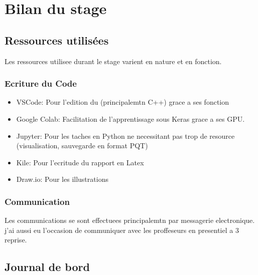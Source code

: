 
\chapter{Bilan du stage} %

\label{Chapter5} %


\section{Ressources utilisées}

Les ressources utilisee durant le stage varient en nature et en fonction.

\subsection{Ecriture du Code}
\begin{itemize}
 \item VSCode: Pour l'edition du (principalemtn C++) grace a ses fonction 
 \item Google Colab: Facilitation de l'apprentissage sous Keras grace a ses GPU.
 \item Jupyter: Pour les taches en Python ne necessitant pas trop de resource (visualisation, sauvegarde en format PQT)
 \item Kile: Pour l'ecritude du rapport en Latex
 \item Draw.io: Pour les illustrations 
\end{itemize}


\subsection{Communication}
Les communications se sont effectuees principalemtn par messagerie electronique. j'ai aussi eu l'occasion de communiquer avec les proffeseurs en presentiel a 3 reprise.


\section{Journal de bord}


